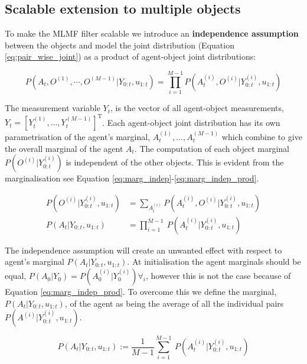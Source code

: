 \subsection{Scalable extension to multiple objects}\label{subsec:scalabe_extension}


To make the MLMF filter scalable we introduce an \textbf{independence assumption} between the objects and model 
the joint distribution (Equation \ref{eq:pair_wise_joint}) as a product of agent-object joint distributions:

\begin{equation}\label{eq:pair_wise_joint}
 P(A_t,O^{(1)},\cdots,O^{(M-1)}|Y_{0:t},u_{1:t}) = \prod\limits_{i=1}^{M-1} P(A^{(i)}_t,O^{(i)}|Y^{(i)}_{0:t},u_{1:t})
\end{equation}

The measurement variable $Y_t$, is the vector of all agent-object 
measurements, $Y_t = \left[Y^{(1)}_t,\dots,Y^{(M-1)}_t\right]^{\mathrm{T}}$. Each agent-object joint distribution has its own parametrisation of the agent's marginal,
$A^{(1)}_t,\dots,A^{(M-1)}_t$ which combine to give the overall marginal of the agent $A_t$. The computation of each object marginal $P(O^{(i)}|Y^{(i)}_{0:t})$ is independent of the other objects. This is evident from the marginalisation 
see Equation \ref{eq:marg_indep}-\ref{eq:marg_indep_prod}.

\begin{align}
 P(O^{(i)}|Y^{(i)}_{0:t},u_{1:t}) &= \sum\limits_{A^{(i)}_t} P(A^{(i)}_t,O^{(i)}|Y^{(i)}_{0:t},u_{1:t}) \label{eq:marg_indep} \\
 P(A_t|Y_{0:t},u_{1:t})   &=\prod\limits_{i=1}^{M-1} \ P(A^{(i)}_t|Y^{(i)}_{0:t},u_{1:t}) \label{eq:marg_indep_prod}  
\end{align}

The independence assumption will create an unwanted effect with respect to agent's marginal $P(A_t|Y_{0:t},u_{1:t})$. 
At initialisation the agent marginals should be equal, $P(A_0|Y_0) = P(A^{(i)}_0|Y^{(i)}_0) \forall_i$, however this is not the case because of 
Equation \ref{eq:marg_indep_prod}. To overcome this we define the marginal, $P(A_t|Y_{0:t},u_{1:t})$, of the agent as being the average of all the individual
pairs $P(A^{(i)}|Y^{(i)}_{0:t},u_{1:t})$.

\begin{equation}
  P(A_t|Y_{0:t},u_{1:t}) := \frac{1}{M-1} \sum\limits_{i=1}^{M-1} \ P(A^{(i)}_t|Y^{(i)}_{0:t},u_{1:t}) \label{eq:marg_indep_sum}
\end{equation}

